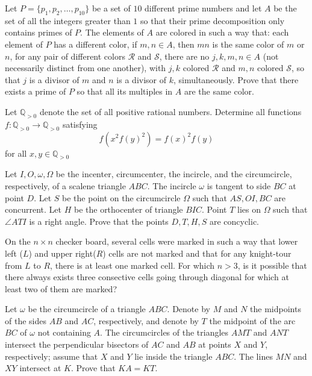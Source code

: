 \documentclass[11pt]{scrartcl}
\begin{document}
\begin{problem}[261061984301321]
Let $P = \{p_1,p_2,\ldots, p_{10}\}$ be a set of $10$ different prime numbers and let $A$ be the set of all the integers greater than $1$ so that their prime decomposition only contains primes of $P$. The elements of $A$ are colored in such a way that:
each element of $P$ has a different color,
if $m,n \in A$, then $mn$ is the same color of $m$ or $n$,
for any pair of different colors $\mathcal{R}$ and $\mathcal{S}$, there are no $j,k,m,n\in A$ (not necessarily distinct from one another), with $j,k$ colored $\mathcal{R}$ and $m,n$ colored $\mathcal{S}$, so that $j$ is a divisor of $m$ and $n$ is a divisor of $k$, simultaneously.
Prove that there exists a prime of $P$ so that all its multiples in $A$ are the same color.
\end{problem}
\begin{problem}[8782897210450267045]
Let $\mathbb{Q}_{>0}$ denote the set of all positive rational numbers. Determine all functions $f:\mathbb{Q}_{>0}\to \mathbb{Q}_{>0}$ satisfying$$f(x^2f(y)^2)=f(x)^2f(y)$$for all $x,y\in\mathbb{Q}_{>0}$
\end{problem}
\begin{problem}[1168447466971762345]
	Let $I, O, \omega, \Omega$ be the incenter, circumcenter, the incircle, and the circumcircle, respectively, of a scalene triangle $ABC$. The incircle $\omega$ is tangent to side $BC$ at point $D$. Let $S$ be the point on the circumcircle $\Omega$ such that $AS, OI, BC$ are concurrent. Let $H$ be the orthocenter of triangle $BIC$. Point $T$ lies on $\Omega$ such that $\angle ATI$ is a right angle. Prove that the points $D, T, H, S$ are concyclic.
\end{problem}
\begin{problem}[409149115429190]
	On the $n\times n$ checker board, several cells were marked in such a way that lower left ($L$) and upper right($R$) cells are not marked and that for any knight-tour from $L$ to $R$, there is at least one marked cell. For which $n>3$, is it possible that there always exists three consective cells going through diagonal for which at least two of them are marked?
\end{problem}
\begin{problem}[33618537498844]
Let $\omega$ be the circumcircle of a triangle $ABC$. Denote by $M$ and $N$ the midpoints of the sides $AB$ and $AC$, respectively, and denote by $T$ the midpoint of the arc $BC$ of $\omega$ not containing $A$. The circumcircles of the triangles $AMT$ and $ANT$ intersect the perpendicular bisectors of $AC$ and $AB$ at points $X$ and $Y$, respectively; assume that $X$ and $Y$ lie inside the triangle $ABC$. The lines $MN$ and $XY$ intersect at $K$. Prove that $KA=KT$.
\end{problem}
\end{document}
